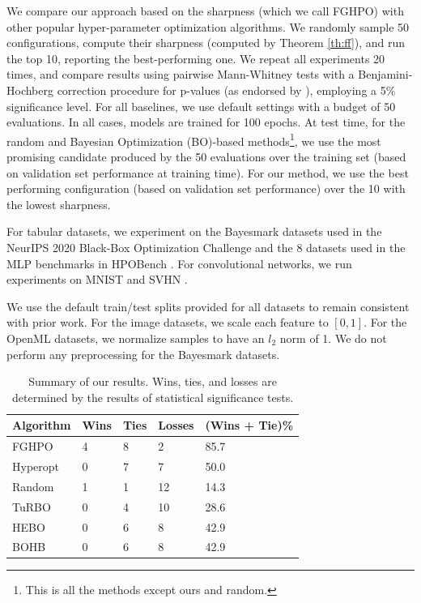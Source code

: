 \documentclass[preprint,12pt]{elsarticle}
\newcommand{\IT}{FGHPO}
\begin{document}
We compare our approach based on the sharpness (which we call {\IT}) with other popular hyper-parameter optimization algorithms. We randomly sample 50 configurations, compute their sharpness (computed by Theorem \ref{th:ff}), and run the top 10, reporting the best-performing one. We repeat all experiments 20 times, and compare results using pairwise Mann-Whitney tests \cite{mann1947test} with a Benjamini-Hochberg correction procedure for p-values (as endorsed by \citet{farcomeni2008review}), employing a 5\% significance level. For all baselines, we use default settings with a budget of 50 evaluations. In all cases, models are trained for 100 epochs. At test time, for the random and Bayesian Optimization (BO)-based methods\footnote{This is all the methods except ours and random.}, we use the most promising candidate produced by the 50 evaluations over the training set (based on validation set performance at training time). For our method, we use the best performing configuration (based on validation set performance) over the 10 with the lowest sharpness.

For tabular datasets, we experiment on the Bayesmark datasets used in the NeurIPS 2020 Black-Box Optimization Challenge and the 8 datasets used in the MLP benchmarks in HPOBench \cite{eggensperger2021hpobench}. For convolutional networks, we run experiments on MNIST \cite{lecun1998mnist} and SVHN \cite{netzer2011reading}.

We use the default train/test splits provided for all datasets to remain consistent with prior work. For the image datasets, we scale each feature to $[0, 1]$. For the OpenML datasets, we normalize samples to have an $l_2$ norm of 1. We do not perform any preprocessing for the Bayesmark datasets.

\begin{table}[ht]
    \centering
    \small
    \caption{Summary of our results. Wins, ties, and losses are determined by the results of statistical significance tests.}
    \label{tab:results:overall}
    \begin{tabular}{lllll}
        \toprule
        \textbf{Algorithm} & \textbf{Wins} & \textbf{Ties} & \textbf{Losses} & \textbf{(Wins + Tie)\%} \\
        \midrule
        {\IT} & 4 & 8 & 2 & 85.7 \\
        Hyperopt & 0 & 7 & 7 & 50.0 \\
        Random & 1 & 1 & 12 & 14.3 \\
        TuRBO & 0 & 4 & 10 & 28.6 \\
        HEBO & 0 & 6 & 8 & 42.9 \\
        BOHB & 0 & 6 & 8 & 42.9 \\
        \bottomrule
    \end{tabular}
\end{table}
\end{document}
